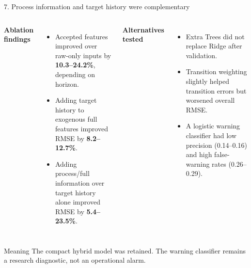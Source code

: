 \documentclass[10pt,aspectratio=169]{beamer}
\begin{document}
\begin{frame}{7. Process information and target history were complementary}
  \begin{columns}[T,onlytextwidth]
      \textbf{Ablation findings}
      \begin{itemize}
        \item Accepted features improved over raw-only inputs by \textbf{10.3--24.2\%}, depending on horizon.
        \item Adding target history to exogenous full features improved RMSE by \textbf{8.2--12.7\%}.
        \item Adding process/full information over target history alone improved RMSE by \textbf{5.4--23.5\%}.
      \end{itemize}
      \textbf{Alternatives tested}
      \begin{itemize}
        \item Extra Trees did not replace Ridge after validation.
        \item Transition weighting slightly helped transition errors but worsened overall RMSE.
        \item A logistic warning classifier had low precision (0.14--0.16) and high false-warning rates (0.26--0.29).
      \end{itemize}
  \end{columns}

  \vfill
  \begin{block}{Meaning}
    The compact hybrid model was retained. The warning classifier remains a research diagnostic, not an operational alarm.
  \end{block}
\end{frame}
\end{document}
